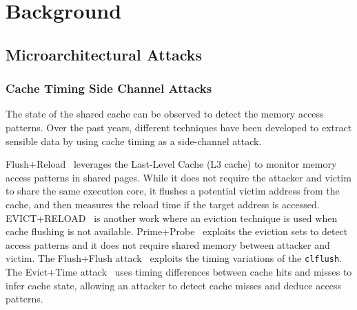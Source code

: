 
\section{Background}
\subsection{Microarchitectural Attacks}
\subsubsection{Cache Timing Side Channel Attacks}

The state of the shared cache can be observed to detect the memory access patterns. Over the past years, different techniques have been developed to extract sensible data by using cache timing as a side-channel attack.

Flush+Reload~\cite{yarom2014flush+} leverages the Last-Level Cache (L3 cache) to monitor memory access patterns in shared pages. While it does not require the attacker and victim to share the same execution core, it flushes a potential victim address from the cache, and then measures the reload time if the target address is accessed. EVICT+RELOAD~\cite{gruss2015cache} is another work where an eviction technique is used when cache flushing is not available. Prime+Probe~\cite{liu2015last} exploits the eviction sets to detect access patterns and it does not require shared memory between attacker and victim.
%
The Flush+Flush attack~\cite{gruss2016flush+} exploits the timing variations of the \texttt{clflush}. The Evict+Time attack~\cite{osvik2006cache} uses timing differences between cache hits and misses to infer cache state, allowing an attacker to detect cache misses and deduce access patterns. %
%


